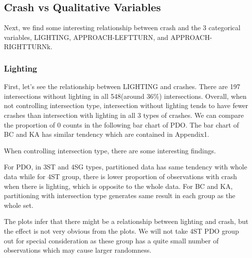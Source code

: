 \documentclass[11pt]{scrartcl} %
\begin{document}
\subsection{Crash vs Qualitative Variables}

Next, we find some interesting relationship between crash and the 3 categorical variables, LIGHTING, APPROACH-LEFTTURN, and APPROACH-RIGHTTURNk.

\subsubsection{Lighting}

First, let's see the relationship between LIGHTING and crashes. There are 197 intersections without lighting in all 548(around 36\%) intersections. Overall, when not controlling intersection type, intersection without lighting tends to have fewer crashes than intersection with lighting in all 3 types of crashes. We can compare the proportion of 0 counts in the following bar chart of PDO. The bar chart of BC and KA has similar tendency which are contained in Appendix1.

When controlling intersection type, there are some interesting findings.

For PDO, in 3ST and 4SG types, partitioned data has same tendency with whole data while for 4ST group, there is lower proportion of observations with crash when there is lighting, which is opposite to the whole data. For BC and KA, partitioning with intersection type generates same result in each group as the whole set.

The plots infer that there might be a relationship between lighting and crash, but the effect is not very obvious from the plots. We will not take 4ST PDO group out for special consideration as these group has a quite small number of observations which may cause larger randomness.
\end{document}
